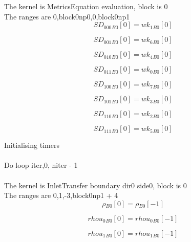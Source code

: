 \documentclass{article}
\begin{document}
\noindent The kernel is MetricsEquation evaluation, block is 0\\\noindent The ranges are 0,block0np0,0,block0np1\\\begin{dmath}{SD_{000}{_{B0}}}[{0}] = {wk_{1}{_{B0}}}[{0}]\end{dmath}

\begin{dmath}{SD_{001}{_{B0}}}[{0}] = {wk_{6}{_{B0}}}[{0}]\end{dmath}

\begin{dmath}{SD_{010}{_{B0}}}[{0}] = {wk_{4}{_{B0}}}[{0}]\end{dmath}

\begin{dmath}{SD_{011}{_{B0}}}[{0}] = {wk_{0}{_{B0}}}[{0}]\end{dmath}

\begin{dmath}{SD_{100}{_{B0}}}[{0}] = {wk_{7}{_{B0}}}[{0}]\end{dmath}

\begin{dmath}{SD_{101}{_{B0}}}[{0}] = {wk_{3}{_{B0}}}[{0}]\end{dmath}

\begin{dmath}{SD_{110}{_{B0}}}[{0}] = {wk_{2}{_{B0}}}[{0}]\end{dmath}

\begin{dmath}{SD_{111}{_{B0}}}[{0}] = {wk_{5}{_{B0}}}[{0}]\end{dmath}

\noindent Initialising timers\\
\\\noindent Do loop iter,0, niter - 1\\
\\\noindent The kernel is InletTransfer boundary dir0 side0, block is 0\\\noindent The ranges are 0,1,-3,block0np1 + 4\\\begin{dmath}{\rho{_{B0}}}[{0}] = {\rho{_{B0}}}[{-1}]\end{dmath}

\begin{dmath}{rhou_{0}{_{B0}}}[{0}] = {rhou_{0}{_{B0}}}[{-1}]\end{dmath}

\begin{dmath}{rhou_{1}{_{B0}}}[{0}] = {rhou_{1}{_{B0}}}[{-1}]\end{dmath}
\end{document}
